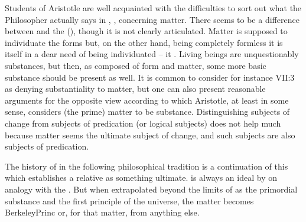 \pa\label{pa:matterAristotle} Students of Aristotle are well acquainted with the
difficulties to sort out what the Philosopher actually says in
, ,  concerning matter. There
seems to be a difference between  and the 
(), though it is not clearly articulated. Matter is supposed to individuate the forms but, on the other
hand, being completely formless it is itself in a dear need of being
individuated -- it . Living beings are unquestionably
substances, but then, as composed of form and matter, some more basic substance
should be present as well. It is common to consider for instance
 VII:3 as denying substantiality to matter, but one
can also present reasonable arguments for the opposite view according to which
Aristotle, at least in some sense, considers (the prime) matter to be
substance.  Distinguishing subjects of
change from subjects of predication (or logical subjects) does not help much
because matter seems the ultimate subject of change, and such subjects are also
subjects of predication.


\pa The history of  in the following philosophical tradition 
is a continuation of this  which establishes
a relative  as something ultimate.  is
always an ideal  by  on analogy
with the .
But when extrapolated beyond the limits of  as the primordial
  substance and the first principle of the universe, the matter becomes
    \citet{an incomprehensible somewhat,
  which hath none of those particular qualities whereby the bodies falling under
  our senses are distinguished from one another}{BerkeleyPrinc}{} or,
for that matter, from anything else.

